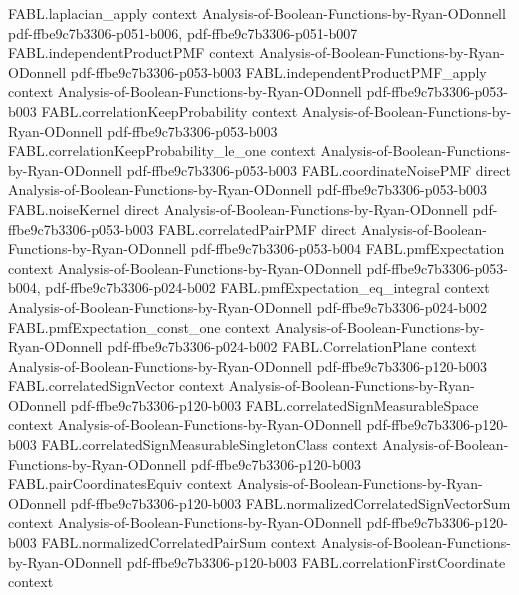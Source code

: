 \begin{theorem}
\proofstep
  {FABL.laplacian_apply}
  {context}
  {Analysis-of-Boolean-Functions-by-Ryan-ODonnell}
  {pdf-ffbe9c7b3306-p051-b006,
    pdf-ffbe9c7b3306-p051-b007}
\proofstep
  {FABL.independentProductPMF}
  {context}
  {Analysis-of-Boolean-Functions-by-Ryan-ODonnell}
  {pdf-ffbe9c7b3306-p053-b003}
\proofstep
  {FABL.independentProductPMF_apply}
  {context}
  {Analysis-of-Boolean-Functions-by-Ryan-ODonnell}
  {pdf-ffbe9c7b3306-p053-b003}
\proofstep
  {FABL.correlationKeepProbability}
  {context}
  {Analysis-of-Boolean-Functions-by-Ryan-ODonnell}
  {pdf-ffbe9c7b3306-p053-b003}
\proofstep
  {FABL.correlationKeepProbability_le_one}
  {context}
  {Analysis-of-Boolean-Functions-by-Ryan-ODonnell}
  {pdf-ffbe9c7b3306-p053-b003}
\proofstep
  {FABL.coordinateNoisePMF}
  {direct}
  {Analysis-of-Boolean-Functions-by-Ryan-ODonnell}
  {pdf-ffbe9c7b3306-p053-b003}
\proofstep
  {FABL.noiseKernel}
  {direct}
  {Analysis-of-Boolean-Functions-by-Ryan-ODonnell}
  {pdf-ffbe9c7b3306-p053-b003}
\proofstep
  {FABL.correlatedPairPMF}
  {direct}
  {Analysis-of-Boolean-Functions-by-Ryan-ODonnell}
  {pdf-ffbe9c7b3306-p053-b004}
\proofstep
  {FABL.pmfExpectation}
  {context}
  {Analysis-of-Boolean-Functions-by-Ryan-ODonnell}
  {pdf-ffbe9c7b3306-p053-b004,
    pdf-ffbe9c7b3306-p024-b002}
\proofstep
  {FABL.pmfExpectation_eq_integral}
  {context}
  {Analysis-of-Boolean-Functions-by-Ryan-ODonnell}
  {pdf-ffbe9c7b3306-p024-b002}
\proofstep
  {FABL.pmfExpectation_const_one}
  {context}
  {Analysis-of-Boolean-Functions-by-Ryan-ODonnell}
  {pdf-ffbe9c7b3306-p024-b002}
\proofstep
  {FABL.CorrelationPlane}
  {context}
  {Analysis-of-Boolean-Functions-by-Ryan-ODonnell}
  {pdf-ffbe9c7b3306-p120-b003}
\proofstep
  {FABL.correlatedSignVector}
  {context}
  {Analysis-of-Boolean-Functions-by-Ryan-ODonnell}
  {pdf-ffbe9c7b3306-p120-b003}
\proofstep
  {FABL.correlatedSignMeasurableSpace}
  {context}
  {Analysis-of-Boolean-Functions-by-Ryan-ODonnell}
  {pdf-ffbe9c7b3306-p120-b003}
\proofstep
  {FABL.correlatedSignMeasurableSingletonClass}
  {context}
  {Analysis-of-Boolean-Functions-by-Ryan-ODonnell}
  {pdf-ffbe9c7b3306-p120-b003}
\proofstep
  {FABL.pairCoordinatesEquiv}
  {context}
  {Analysis-of-Boolean-Functions-by-Ryan-ODonnell}
  {pdf-ffbe9c7b3306-p120-b003}
\proofstep
  {FABL.normalizedCorrelatedSignVectorSum}
  {context}
  {Analysis-of-Boolean-Functions-by-Ryan-ODonnell}
  {pdf-ffbe9c7b3306-p120-b003}
\proofstep
  {FABL.normalizedCorrelatedPairSum}
  {context}
  {Analysis-of-Boolean-Functions-by-Ryan-ODonnell}
  {pdf-ffbe9c7b3306-p120-b003}
\proofstep
  {FABL.correlationFirstCoordinate}
  {context}

\end{theorem}
